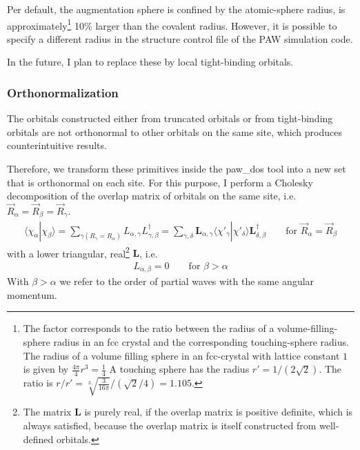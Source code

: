 \documentclass[final,12pt,makeidx,DIV=calc]{article}
\newcommand{\mat}[1]{\mathbf{#1}}
\begin{document}
{{{{{{Per default, the augmentation sphere is confined by the atomic-sphere
radius, is approximately\footnote{The factor corresponds to the ratio
  between the radius of a volume-filling-sphere radius in an fcc
  crystal and the corresponding touching-sphere radius.  The radius of
  a volume filling sphere in an fcc-crystal with lattice constant $1$
  is given by $\frac{4\pi}{4}r^3=\frac{1}{4}$ A touching sphere has
  the radius $r'=1/(2\sqrt{2})$. The ratio is
  $r/r'=\sqrt[3]{\frac{3}{16\pi}}/(\sqrt{2}/4)=1.105$.} 10\% larger
than the covalent radius.  However, it is possible to specify a
different radius in the structure control file of the PAW simulation
code.

In the future, I plan to replace these by local tight-binding orbitals.

\subsubsection{Orthonormalization}
The orbitals constructed either from truncated orbitals or from
tight-binding orbitals are not orthonormal to other orbitals on the
same site, which produces counterintuitive results.

Therefore, we transform these primitives inside the paw\_dos tool into
a new set that is orthonormal on each site. For this purpose, I
perform a Cholesky decomposition of the overlap matrix of orbitals on
the same site, i.e. $\vec{R}_{\alpha}=\vec{R}_\beta=\vec{R}_\gamma$.
\begin{eqnarray}
\langle\chi_\alpha|\chi_\beta\rangle
=\sum_{\gamma (R_\gamma=R_\alpha)}  L_{\alpha,\gamma}L^\dagger_{\gamma,\beta}
=\sum_{\gamma,\delta}\mat{L}_{\alpha,\gamma}
\langle\chi'_\gamma|\chi'_\delta\rangle
\mat{L}^\dagger_{\delta,\beta}
\qquad\text{for $\vec{R}_\alpha=\vec{R}_\beta$}
\end{eqnarray}
with a lower triangular, real\footnote{The matrix $\mat{L}$ is purely
  real, if the overlap matrix is positive definite, which is always
  satisfied, because the overlap matrix is itself constructed from
  well-defined orbitals.} $\mat{L}$, i.e.
\begin{eqnarray}
L_{\alpha,\beta}=0\qquad\text{for $\beta>\alpha$}
\end{eqnarray}
With $\beta>\alpha$ we refer to the order of partial waves with the
same angular momentum. 

}}}}}}
\end{document}
